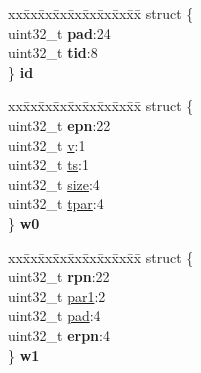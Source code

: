\begin{DoxyCompactItemize}
\begin{tabbing}
\end{tabbing}\item 
\mbox{\label{structbsp__tlb__entry__t_abd05b887d31e6007c8e7867eed8d01b2}} 
\begin{tabbing}
xx\=xx\=xx\=xx\=xx\=xx\=xx\=xx\=xx\=\kill
struct \{\\
\>uint32\_t {\bfseries pad}:24\\
\>uint32\_t {\bfseries tid}:8\\
\} {\bfseries id}\\

\end{tabbing}\item 
\mbox{\label{structbsp__tlb__entry__t_a8e285830f135c62b15bde625125ac210}} 
\begin{tabbing}
xx\=xx\=xx\=xx\=xx\=xx\=xx\=xx\=xx\=\kill
struct \{\\
\>uint32\_t {\bfseries epn}:22\\
\>uint32\_t \mbox{\hyperlink{structbsp__tlb__entry__t_ac5250e55576956fca7761e1e2f746f61}{v}}:1\\
\>uint32\_t \mbox{\hyperlink{structbsp__tlb__entry__t_a8efb1354b1b4467886f2dc785f2d1e9d}{ts}}:1\\
\>uint32\_t \mbox{\hyperlink{structbsp__tlb__entry__t_a1315440aa4e0419c651bf0d78ca815ee}{size}}:4\\
\>uint32\_t \mbox{\hyperlink{structbsp__tlb__entry__t_a008bfee2c5b2cce0aa23484b7e539a04}{tpar}}:4\\
\} {\bfseries w0}\\

\end{tabbing}\item 
\mbox{\label{structbsp__tlb__entry__t_a4a6a7d0bec1a2f3fac3551f017dc7244}} 
\begin{tabbing}
xx\=xx\=xx\=xx\=xx\=xx\=xx\=xx\=xx\=\kill
struct \{\\
\>uint32\_t {\bfseries rpn}:22\\
\>uint32\_t \mbox{\hyperlink{structbsp__tlb__entry__t_a7b294c6e7cc96cb1f37e78c64524a6a1}{par1}}:2\\
\>uint32\_t \mbox{\hyperlink{structbsp__tlb__entry__t_abb4d4dec5f523e8e175ba5a0b5234008}{pad}}:4\\
\>uint32\_t {\bfseries erpn}:4\\
\} {\bfseries w1}\\


\end{tabbing}
\end{DoxyCompactItemize}
